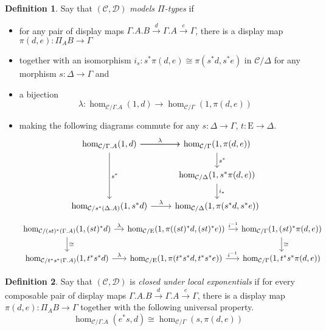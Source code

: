 \documentclass{article}
\theoremstyle{definition}
\newtheorem{definition}{Definition}[section]
\newcommand{\C}{\mathcal C}
\newcommand{\D}{\mathcal D}
\newcommand{\Epsilon}{\mathrm E}
\begin{document}
\begin{definition}
    Say that $(\C, \D)$ \emph{models $\Pi$-types} if 
    \begin{itemize}
        \item for any pair of display maps $\Gamma.A . B \xrightarrow{d} \Gamma. A  \xrightarrow{e} \Gamma$, there is a display map $\pi(d,e) : \Pi_A B \to \Gamma$
        \item together with an isomorphism $i_s : s^* \pi(d,e) \cong \pi(s^*d, s^*e)$ in $\C / \Delta$ for any morphism $s : \Delta \to \Gamma$ and
        \item a bijection
        \[ \lambda : \hom_{\C / \Gamma . A} (1, d) \to \hom_{\C / \Gamma} (1 , {\pi(d,e)})\]
        \item making the following diagrams commute for any $s : \Delta \to \Gamma$, $t : \Epsilon \to \Delta$.
        \[
     \begin{tikzcd}
        \hom_{\C / \Gamma . A} (1, d) \ar[r," "] \ar[dd,"s^*"] \ar[r, "\lambda"] & \hom_{\C / \Gamma} (1 , {\pi(d,e)}) \ar[d,"s^*"]
         \\
         & \hom_{\C / \Delta} (1 , s^* {\pi(d,e)})
         \ar[d,"i_*"]
         \\
         \hom_{\C / s^*(\Delta . A)} (1, s^* d) \ar[r,"\lambda"] & \hom_{\C / \Delta} (1 ,  {\pi(s^*d,s^*e)})
     \end{tikzcd}
\]
\[
     \begin{tikzcd}[column sep=small]
        \hom_{\C / (st)^*(\Gamma . A)} (1, (st)^*d) \ar[d,"\cong"] \ar[r, "\lambda"] &
        \hom_{\C / \Epsilon} (1 , {\pi((st)^*d,(st)^*e)})  \ar[r,"i^{-1}"]
        &  \hom_{\C / \Gamma} (1 , (st)^* \pi(d,e)) \ar[d,"\cong"]
        \\
        \hom_{\C / t^* s^* (\Gamma . A)} (1, t^* s^*d)  \ar[r, "\lambda"] &
        \hom_{\C / \Epsilon} (1 , {\pi(t^* s^*d,t^* s^*e)})  \ar[r,"i^{-1}"]
        &  \hom_{\C / \Gamma} (1 , t^* s^* \pi(d,e)) 
     \end{tikzcd}
\]
    \end{itemize}
\end{definition}

\begin{definition}
    Say that $(\C, \D)$ is \emph{closed under local exponentials} if for every composable pair of display maps $\Gamma.A . B \xrightarrow{d} \Gamma. A  \xrightarrow{e} \Gamma$, there is a display map $\pi(d,e) : \Pi_A B \to \Gamma$ together with the following universal property.
    \[ \hom_{\C / \Gamma . A} (e^* s,  d) \cong \hom_{\C / \Gamma} (s, {\pi(d,e)}) \]
\end{definition}
\end{document}
